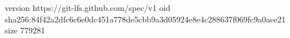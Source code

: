 version https://git-lfs.github.com/spec/v1
oid sha256:84f42a2dfc6c6e0dc451a778de5cbb9a3d05924e8e4c288637f069fc9a0aee21
size 779281
